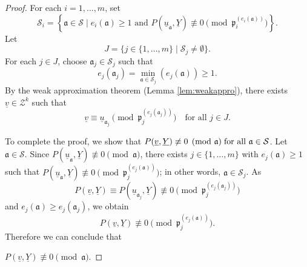 \documentclass[11pt,a4paper,reqno]{amsart}
\theoremstyle{definition}
\begin{document}
\begin{proof}
For each 
$i=1,\ldots, m$, set
$$
\mathcal{S}_i=\left\lbrace \mathfrak{a}\in \mathcal{S} \mid e_i(\mathfrak{a})\geq 1\,\, \textrm{and}\,\,P(\underline{u}_{\mathfrak{a}},\underline{Y})\not\equiv 0 \pmod{\mathfrak{p}_i^{(e_i(\mathfrak{a}))}}\right\rbrace.
$$
Let 
$$
J=\{ j \in \{1,\dots,m \} \mid \mathcal{S}_j\neq \emptyset\}.
$$ 
For each $j \in J$, choose $\mathfrak{a}_j \in \mathcal{S}_j$ such that $$
e_j(\mathfrak{a}_j)=\min_{\mathfrak{a} \in \mathcal{S}_j}(e_j(\mathfrak{a})) \geq 1.
$$ By the weak approximation theorem  (Lemma \ref{lem:weakappro}), there exists $\underline{v} \in {\mathcal Z}^k$ such that
$$
\underline{v} \equiv \underline{u}_{\mathfrak{a}_j} \pmod{\mathfrak{p}_j^{(e_j(\mathfrak{a}_j))}}\quad \textrm{for all } j \in J.
$$  

To complete the proof, we show that 
$P(\underline{v},\underline{Y}) \not \equiv 0 \pmod{\mathfrak{a}}\hskip 1mm \textrm{for all }\mathfrak{a} \in \mathcal{S}$.
Let $\mathfrak{a} \in \mathcal{S}$. Since $P(\underline{u}_{\mathfrak{a}},\underline{Y})\not\equiv 0 \pmod{\mathfrak{a}}$, there exists $j \in \{1,\dots,m\}$ with $e_j(\mathfrak{a}) \geq 1$ such that $P(\underline{u}_{\mathfrak{a}},\underline{Y})\not\equiv 0 \pmod{\mathfrak{p}_j^{(e_j(\mathfrak{a}))}}$; in other words, $\mathfrak{a} \in \mathcal{S}_j$. As 
$$P(\underline{v},\underline{Y}) \equiv P(\underline{u}_{\mathfrak{a}_j},\underline{Y}) \not\equiv 0 \pmod{\mathfrak{p}_j^{(e_j(\mathfrak{a}_j))}}
$$ and $e_j(\mathfrak{a}) \geq e_j(\mathfrak{a}_j)$, we obtain $$
P(\underline{v},\underline{Y}) \not\equiv 0 \pmod{\mathfrak{p}_j^{(e_j(\mathfrak{a}))}}.
$$ Therefore we can conclude that
\vskip 1mm

\hskip 55mm {$P(\underline{v},\underline{Y}) \not\equiv 0 \pmod{\mathfrak{a}}.
$} \end{proof}
\end{document}

